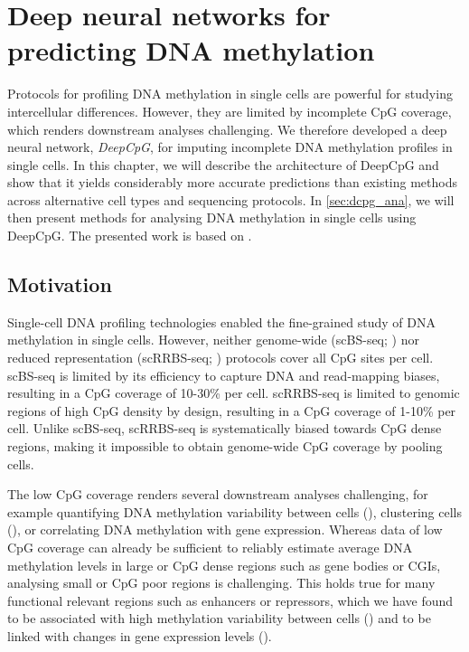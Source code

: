 \chapter{Deep neural networks for predicting DNA methylation} \label{sec:dcpg}

\ifpdf
    \graphicspath{{Chapter4/Figs/Raster/}{Chapter4/Figs/PDF/}{Chapter4/Figs/}}
\else
    \graphicspath{{Chapter4/Figs/Vector/}{Chapter4/Figs/}}
\fi

Protocols for profiling DNA methylation in single cells are powerful for studying intercellular differences. However, they are limited by incomplete CpG coverage, which renders downstream analyses challenging. We therefore developed a deep neural network, \emph{DeepCpG}, for imputing incomplete DNA methylation profiles in single cells. In this chapter, we will describe the architecture of DeepCpG and show that it yields considerably more accurate predictions than existing methods across alternative cell types and sequencing protocols. In \cref{sec:dcpg_ana}, we will then present methods for analysing DNA methylation in single cells using DeepCpG. The presented work is based on \citet{angermueller_accurate_2017}.


\section{Motivation}

Single-cell DNA profiling technologies enabled the fine-grained study of DNA methylation in single cells. However, neither genome-wide (scBS-seq; ) nor reduced representation (scRRBS-seq; ) protocols cover all CpG sites per cell. scBS-seq is limited by its efficiency to capture DNA and read-mapping biases, resulting in a CpG coverage of 10-30\% per cell. scRRBS-seq is limited to genomic regions of high CpG density by design, resulting in a CpG coverage of 1-10\% per cell. Unlike scBS-seq, scRRBS-seq is systematically biased towards CpG dense regions, making it impossible to obtain genome-wide CpG coverage by pooling cells.

The low CpG coverage renders several downstream analyses challenging, for example quantifying DNA methylation variability between cells (), clustering cells (), or correlating DNA methylation with gene expression. Whereas data of low CpG coverage can already be sufficient to reliably estimate average DNA methylation levels in large or CpG dense regions such as gene bodies or CGIs, analysing small or CpG poor regions is challenging. This holds true for many functional relevant regions such as enhancers or repressors, which we have found to be associated with high methylation variability between cells () and to be linked with changes in gene expression levels ().

